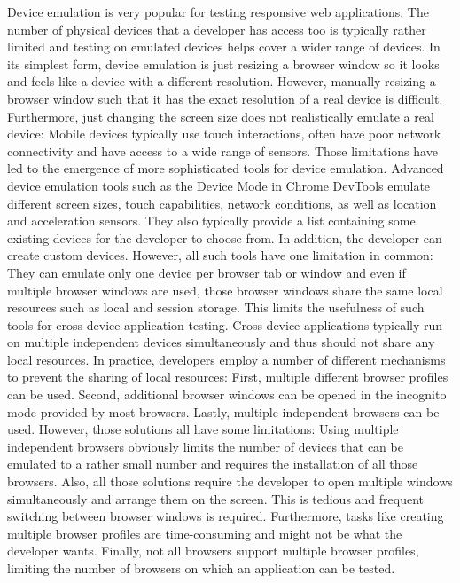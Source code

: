Device emulation is very popular for testing responsive web applications. The number of physical devices that a developer has access too is typically rather limited and testing on emulated devices helps cover a wider range of devices. In its simplest form, device emulation is just resizing a browser window so it looks and feels like a device with a different resolution. However, manually resizing a browser window such that it has the exact resolution of a real device is difficult. Furthermore, just changing the screen size does not realistically emulate a real device: Mobile devices typically use touch interactions, often have poor network connectivity and have access to a wide range of sensors. Those limitations have led to the emergence of more sophisticated tools for device emulation. Advanced device emulation tools such as the Device Mode in Chrome DevTools emulate different screen sizes, touch capabilities, network conditions, as well as location and acceleration sensors. They also typically provide a list containing some existing devices for the developer to choose from. In addition, the developer can create custom devices. However, all such tools have one limitation in common: They can emulate only one device per browser tab or window and even if multiple browser windows are used, those browser windows share the same local resources such as local and session storage. This limits the usefulness of such tools for cross-device application testing. Cross-device applications typically run on multiple independent devices simultaneously and thus should not share any local resources. In practice, developers employ a number of different mechanisms to prevent the sharing of local resources: First, multiple different browser profiles can be used. Second, additional browser windows can be opened in the incognito mode provided by most browsers. Lastly, multiple independent browsers can be used. However, those solutions all have some limitations: Using multiple independent browsers obviously limits the number of devices that can be emulated to a rather small number and requires the installation of all those browsers. Also, all those solutions require the developer to open multiple windows simultaneously and arrange them on the screen. This is tedious and frequent switching between browser windows is required. Furthermore, tasks like creating multiple browser profiles are time-consuming and might not be what the developer wants. Finally, not all browsers support multiple browser profiles, limiting the number of browsers on which an application can be tested. 

